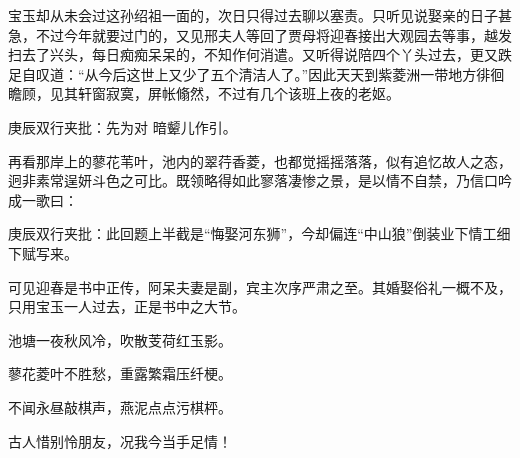 \begin{parag}
    宝玉却从未会过这孙绍祖一面的，次日只得过去聊以塞责。只听见说娶亲的日子甚急，不过今年就要过门的，又见邢夫人等回了贾母将迎春接出大观园去等事，越发扫去了兴头，每日痴痴呆呆的，不知作何消遣。又听得说陪四个丫头过去，更又跌足自叹道：“从今后这世上又少了五个清洁人了。”因此天天到紫菱洲一带地方徘徊瞻顾，见其轩窗寂寞，屏帐翛然，不过有几个该班上夜的老妪。\begin{note}庚辰双行夹批：先为对 暗颦儿作引。\end{note}再看那岸上的蓼花苇叶，池内的翠荇香菱，也都觉摇摇落落，似有追忆故人之态，迥非素常逞妍斗色之可比。既领略得如此寥落凄惨之景，是以情不自禁，乃信口吟成一歌曰：\begin{note}庚辰双行夹批：此回题上半截是“悔娶河东狮”，今却偏连“中山狼”倒装业下情工细下赋写来。\end{note}\begin{note}可见迎春是书中正传，阿呆夫妻是副，宾主次序严肃之至。其婚娶俗礼一概不及，只用宝玉一人过去，正是书中之大节。\end{note}
\end{parag}


\begin{poem}
    \begin{pl}

        池塘一夜秋风冷，吹散芰荷红玉影。
    \end{pl}
    \begin{pl}
        蓼花菱叶不胜愁，重露繁霜压纤梗。
    \end{pl}
    \begin{pl}
        不闻永昼敲棋声，燕泥点点污棋枰。
    \end{pl}
    \begin{pl}
        古人惜别怜朋友，况我今当手足情！
    \end{pl}
\end{poem}


